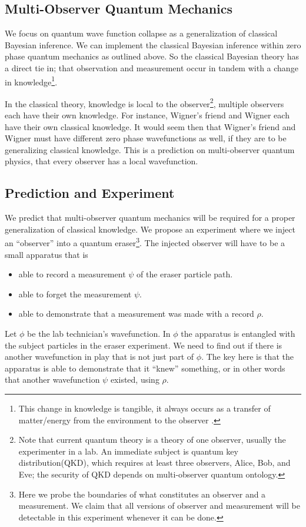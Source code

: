 \documentclass[12pt,a4paper]{article}
\begin{document}
\subsection{Multi-Observer Quantum Mechanics}
We focus on quantum wave function collapse as a generalization of classical Bayesian inference.  We can implement the classical Bayesian inference within zero phase quantum mechanics as outlined above.  So the classical Bayesian theory has a direct tie in; that observation and measurement occur in tandem with a change in knowledge\footnote{This change in knowledge is tangible, it always occurs as a transfer of matter/energy from the environment to the observer \cite{thrust}.}.  

In the classical theory, knowledge is local to the observer\footnote{Note that current quantum theory is a theory of one observer, usually the experimenter in a lab.  An immediate subject is quantum key distribution(QKD), which requires at least three observers, Alice, Bob, and Eve; the security of QKD depends on multi-observer quantum ontology.}, multiple observers each have their own knowledge.  For instance, Wigner's friend and Wigner each have their own classical knowledge.  It would seem then that Wigner's friend and Wigner must have different zero phase wavefunctions as well, if they are to be generalizing classical knowledge.  This is a prediction on multi-observer quantum physics, that every observer has a local wavefunction. 

\subsection{Prediction and Experiment}

We predict that multi-observer quantum mechanics will be required for a proper generalization of classical knowledge.  We propose an experiment where we inject an ``observer'' into a quantum eraser\footnote{Here we probe the boundaries of what constitutes an observer and a measurement.  We claim that all versions of observer and measurement will be detectable in this experiment whenever it can be done.}.  The injected observer will have to be a small apparatus that is
\begin{itemize}
   \item able to record a measurement $\psi$ of the eraser particle path.
   \item able to forget the measurement $\psi$.
   \item able to demonstrate that a measurement was made with a record $\rho$.
\end{itemize}
Let $\phi$ be the lab technician's wavefunction.  In $\phi$ the apparatus is entangled with the subject particles in the eraser experiment.  We need to find out if there is another wavefunction in play that is not just part of $\phi$.  The key here is that the apparatus is able to demonstrate that it ``knew'' something, or in other words that another wavefunction $\psi$ existed, using $\rho$.
\end{document}
